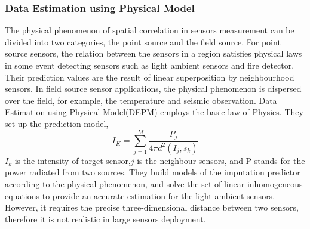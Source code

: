 \subsubsection{Data Estimation using Physical Model}
The physical phenomenon of spatial correlation in sensors measurement can be divided into two categories, the point source and the field source\cite{viran:spatialtemporal}. For point source sensors, the relation between the sensors in a region satisfies physical laws in some event detecting sensors such as light ambient sensors and fire detector. 
Their prediction values are the result of linear superposition by neighbourhood sensors. 
In field source sensor applications, the physical phenomenon is dispersed over the field, for example, the temperature and seismic observation. 
Data Estimation using Physical Model(DEPM)\cite{li2008data} employs the basic law of Physics.
They set up the prediction model,  
\begin{equation}
I_K =\sum_{j=1}^M\frac{P_j}{4\pi d^2(I_j,s_k)}
\label{DEPM}
\end{equation} 
$I_k$ is the intensity of target sensor,$j$ is the neighbour sensors, and P stands for the power radiated from two sources. 
They build models of the imputation predictor according to the physical phenomenon, and solve the set of linear inhomogeneous equations to provide an accurate estimation for the light ambient sensors. However, it requires the precise  three-dimensional distance between two sensors, therefore it is not realistic in large sensors deployment.

